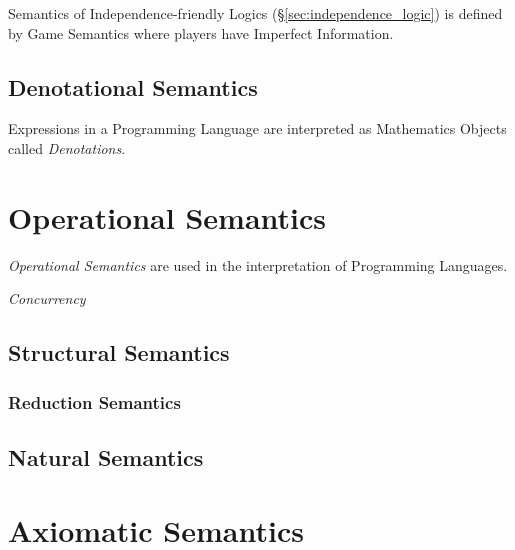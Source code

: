 Semantics of Independence-friendly Logics
(\S\ref{sec:independence_logic}) is defined by Game Semantics where
players have Imperfect Information.

\subsection{Denotational Semantics}

Expressions in a Programming Language are interpreted as Mathematics
Objects called \emph{Denotations}.



\section{Operational Semantics}

\emph{Operational Semantics} are used in the interpretation of
Programming Languages.

\emph{Concurrency}

\subsection{Structural Semantics}

\subsubsection{Reduction Semantics}

\subsection{Natural Semantics}



\section{Axiomatic Semantics}

